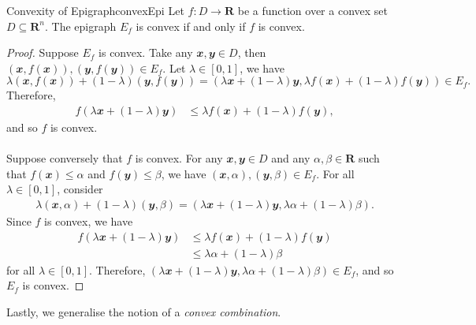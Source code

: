 \documentclass[math, code]{amznotes}
\theoremstyle{remark}
\begin{document}
\begin{probox}{Convexity of Epigraph}{convexEpi}
    Let $f \colon D \to \mathbf{R}$ be a function over a convex set $D \subseteq \mathbf{R}^n$. The epigraph $E_f$ is convex if and only if $f$ is convex.
    \tcblower   
    \begin{proof}
        Suppose $E_f$ is convex. Take any $\mathbfit{x}, \mathbfit{y} \in D$, then $(\mathbfit{x}, f(\mathbfit{x})), (\mathbfit{y}, f(\mathbfit{y})) \in E_f$. Let $\lambda \in [0, 1]$, we have
        \begin{displaymath}
            \lambda(\mathbfit{x}, f(\mathbfit{x})) + (1 - \lambda)(\mathbfit{y}, f(\mathbfit{y})) = (\lambda\mathbfit{x} + (1 - \lambda)\mathbfit{y}, \lambda f(\mathbfit{x}) + (1 - \lambda)f(\mathbfit{y})) \in E_f.
        \end{displaymath}
        Therefore, 
        \begin{align*}
            f\left(\lambda\mathbfit{x} + (1 - \lambda)\mathbfit{y}\right) & \leq \lambda f(\mathbfit{x}) + (1 - \lambda)f(\mathbfit{y}),
        \end{align*}
        and so $f$ is convex.
        \\\\
        Suppose conversely that $f$ is convex. For any $\mathbfit{x}, \mathbfit{y} \in D$ and any $\alpha, \beta \in \mathbf{R}$ such that $f(\mathbfit{x}) \leq \alpha$ and $f(\mathbfit{y}) \leq \beta$, we have $(\mathbfit{x}, \alpha), (\mathbfit{y}, \beta) \in E_f$. For all $\lambda \in [0, 1]$, consider
        \begin{align*}
            \lambda(\mathbfit{x}, \alpha) + (1 - \lambda)(\mathbfit{y}, \beta) = (\lambda\mathbfit{x} + (1 - \lambda)\mathbfit{y}, \lambda\alpha + (1 - \lambda)\beta).
        \end{align*}
        Since $f$ is convex, we have
        \begin{align*}
            f\left(\lambda\mathbfit{x} + (1 - \lambda)\mathbfit{y}\right) & \leq \lambda f(\mathbfit{x}) + (1 - \lambda)f(\mathbfit{y}) \\
            & \leq \lambda\alpha + (1 - \lambda)\beta
        \end{align*}
        for all $\lambda \in [0, 1]$. Therefore, $(\lambda\mathbfit{x} + (1 - \lambda)\mathbfit{y}, \lambda\alpha + (1 - \lambda)\beta) \in E_f$, and so $E_f$ is convex.
    \end{proof}
\end{probox}
Lastly, we generalise the notion of a \textit{convex combination}.
\end{document}
